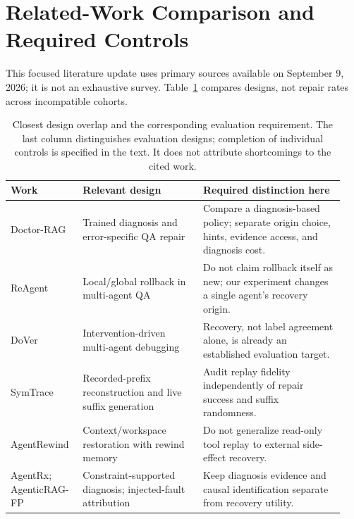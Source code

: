 \documentclass{article}
\begin{document}
\section{Related-Work Comparison and Required Controls}
\label{app:related}
This focused literature update uses primary sources available on
September 9, 2026; it is not an exhaustive survey. Table~\ref{tab:related}
compares designs, not repair rates across incompatible cohorts.

\begin{table}[h]
\centering
\caption{Closest design overlap and the corresponding evaluation requirement.
The last column distinguishes evaluation designs; completion of individual
controls is specified in the text. It does not attribute shortcomings to
the cited work.}
\label{tab:related}
\small
\begin{tabular}{@{}>{\raggedright\arraybackslash}p{0.20\linewidth}
                  >{\raggedright\arraybackslash}p{0.34\linewidth}
                  >{\raggedright\arraybackslash}p{0.40\linewidth}@{}}
\toprule
Work & Relevant design & Required distinction here \\
\midrule
Doctor-RAG & Trained diagnosis and error-specific QA repair & Compare a diagnosis-based policy; separate origin choice, hints, evidence access, and diagnosis cost. \\
ReAgent & Local/global rollback in multi-agent QA & Do not claim rollback itself as new; our experiment changes a single agent's recovery origin. \\
DoVer & Intervention-driven multi-agent debugging & Recovery, not label agreement alone, is already an established evaluation target. \\
SymTrace & Recorded-prefix reconstruction and live suffix generation & Audit replay fidelity independently of repair success and suffix randomness. \\
AgentRewind & Context/workspace restoration with rewind memory & Do not generalize read-only tool replay to external side-effect recovery. \\
AgentRx; AgenticRAG-FP & Constraint-supported diagnosis; injected-fault attribution & Keep diagnosis evidence and causal identification separate from recovery utility. \\
\bottomrule
\end{tabular}
\end{table}
\end{document}
